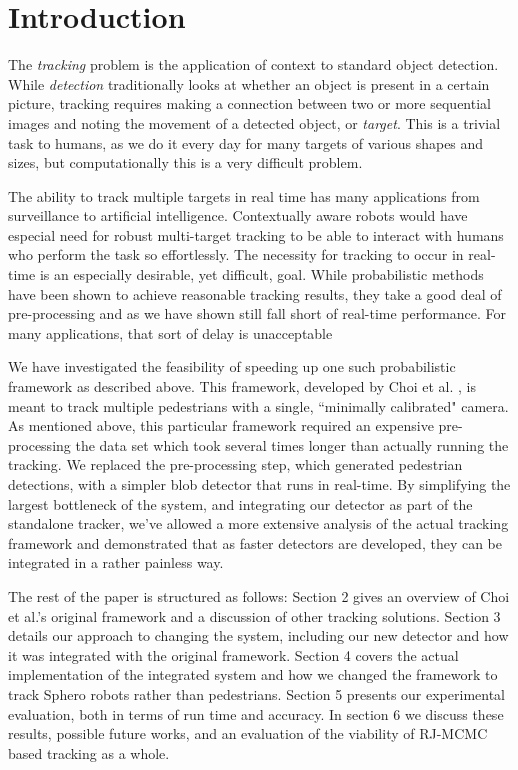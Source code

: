 \section{Introduction}
\label{sec:intro}

The \emph{tracking} problem is the application of context to standard object detection. While \emph{detection}
traditionally looks at whether an object is present in a certain picture, tracking requires making a connection between two
or more sequential images and noting the movement of a detected object, or \emph{target}. This is a trivial task to humans,
as we do it every day for many targets of various shapes and sizes, but computationally this is a very difficult problem.

The ability to track multiple targets in real time has many applications from surveillance to artificial intelligence. Contextually
aware robots would have especial need for robust multi-target tracking to be able to interact with humans who perform the
task so effortlessly. The necessity for tracking to occur in real-time is an especially desirable, yet difficult, goal. While
probabilistic methods have been shown to achieve reasonable tracking results, they take a good deal of pre-processing and as
we have shown still fall short of real-time performance. For many applications, that sort of delay is unacceptable 

We have investigated the feasibility of speeding up one such probabilistic framework as described above. This framework,
developed by Choi et al. \cite{choi2010multiple}, is meant to track multiple pedestrians with a single, ``minimally calibrated"
camera. As mentioned above, this particular framework required an expensive pre-processing the data set which took several
times longer than actually running the tracking. We replaced the pre-processing step, which generated pedestrian detections,
with a simpler blob detector that runs in real-time. By simplifying the largest bottleneck of the system, and integrating our detector
as part of the standalone tracker, we've allowed a more extensive analysis of the actual tracking framework and demonstrated
that as faster detectors are developed, they can be integrated in a rather painless way.

The rest of the paper is structured as follows: Section 2 gives an overview of Choi et al.'s original framework and a discussion of
other tracking solutions. Section 3 details our approach to changing the system, including our new detector and how it was
integrated with the original framework. Section 4 covers the actual implementation of the integrated system and how we changed
the framework to track Sphero robots rather than pedestrians. Section 5 presents our experimental evaluation, both in terms of
run time and accuracy. In section 6 we discuss these results, possible future works, and an evaluation of the viability of
RJ-MCMC based tracking as a whole.